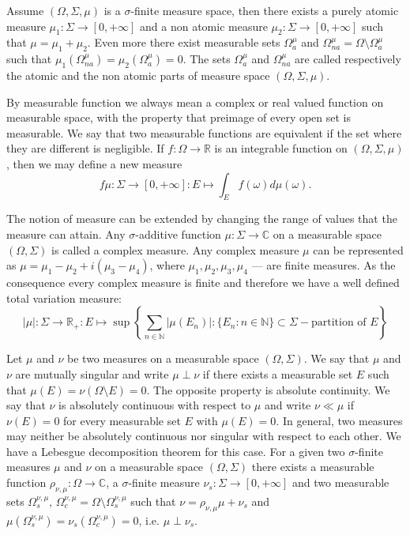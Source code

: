 Assume $(\Omega,\Sigma,\mu)$ is a $\sigma$-finite measure space, then there
exists a purely atomic measure $\mu_1:\Sigma\to[0,+\infty]$ and a non atomic
measure $\mu_2:\Sigma\to[0,+\infty]$ such that $\mu=\mu_1+\mu_2$. Even more
there exist measurable sets $\Omega_a^{\mu}$ and
$\Omega_{na}^{\mu}=\Omega\setminus \Omega_a^{\mu}$ such that
$\mu_1(\Omega_{na}^{\mu})=\mu_2(\Omega_a^{\mu})=0$. The sets $\Omega_a^{\mu}$
and $\Omega_{na}^{\mu}$ are called respectively the atomic and the non atomic
parts of measure space $(\Omega,\Sigma,\mu)$.

By measurable function we always mean a complex or real valued function on
measurable space, with the property that preimage of every open set is
measurable. We say that two measurable functions are equivalent if the set where
they are different is negligible. If $f:\Omega\to\mathbb{R}$ is an  integrable
function on $(\Omega,\Sigma,\mu)$, then we may define a new measure 
$$
f\mu:\Sigma\to[0,+\infty]:E\mapsto\int_{E}f(\omega)d\mu(\omega).
$$

The notion of measure can be extended by changing the range of values that the
measure can attain. Any $\sigma$-additive function $\mu:\Sigma\to\mathbb{C}$ on
a measurable space $(\Omega,\Sigma)$ is called a complex measure. Any complex
measure $\mu$ can be represented as $\mu=\mu_1-\mu_2+i(\mu_3-\mu_4)$, where
$\mu_1,\mu_2,\mu_3,\mu_4$ --- are finite measures. As the consequence every
complex measure is finite and therefore we have a well defined total variation
measure:
$$
|\mu|:\Sigma\to\mathbb{R}_+
:E\mapsto\sup\left \{\sum_{n\in\mathbb{N}}|\mu(E_n)|
: \{E_n:n\in\mathbb{N} \}\subset\Sigma -\mbox{partition of }E\right \}
$$

Let $\mu$ and $\nu$ be two measures on a measurable space $(\Omega,\Sigma)$. We
say that $\mu$ and $\nu$ are mutually singular and write $\mu\perp\nu$ if there
exists a measurable set $E$ such that $\mu(E)=\nu(\Omega\setminus E)=0$. The
opposite property is absolute continuity. We say that $\nu$ is absolutely
continuous with respect to $\mu$ and write $\nu\ll\mu$ if $\nu(E)=0$ for every
measurable set $E$ with $\mu(E)=0$. In general, two measures may neither be
absolutely continuous nor singular with respect to each other. We have a
Lebesgue decomposition theorem for this case. For a given two $\sigma$-finite
measures $\mu$ and $\nu$ on a measurable space $(\Omega,\Sigma)$ there exists a
measurable function $\rho_{\nu,\mu}:\Omega\to\mathbb{C}$, a $\sigma$-finite
measure $\nu_s:\Sigma\to[0,+\infty]$ and two measurable sets
$\Omega_s^{\nu,\mu}$, $\Omega_c^{\nu,\mu}=\Omega\setminus\Omega_s^{\nu,\mu}$
such that $\nu=\rho_{\nu,\mu}\mu+\nu_s$ and
$\mu(\Omega_s^{\nu,\mu})=\nu_s(\Omega_c^{\nu,\mu})=0$, i.e. $\mu\perp\nu_s$.


